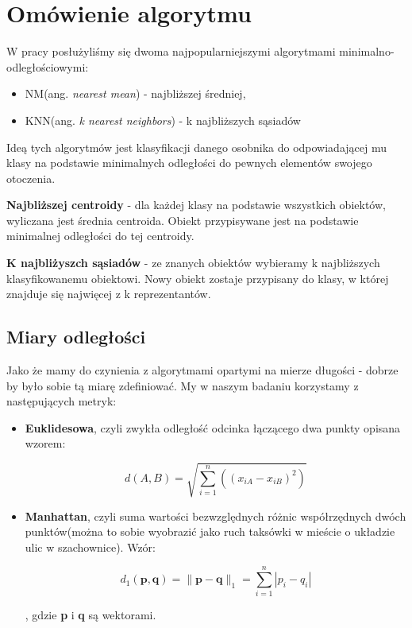 \section{Omówienie algorytmu}
	W pracy posłużyliśmy się dwoma najpopularniejszymi algorytmami minimalno-odległościowymi:
	
	\begin{itemize}
		\item NM(ang. \textit{nearest mean}) - najbliższej średniej,
		\item KNN(ang. \textit{k nearest neighbors}) - k najbliższych sąsiadów
	\end{itemize}

	\bigbreak
	Ideą tych algorytmów jest klasyfikacji danego osobnika do odpowiadającej mu klasy na podstawie minimalnych odległości do pewnych elementów swojego otoczenia.

	\bigbreak
	\textbf{Najbliższej centroidy} - dla każdej klasy na podstawie wszystkich obiektów, wyliczana jest średnia centroida. Obiekt przypisywane jest na podstawie minimalnej odległości do tej centroidy.
	
	\textbf{K najbliżyszch sąsiadów} - ze znanych obiektów wybieramy k najbliższych klasyfikowanemu obiektowi. Nowy obiekt zostaje przypisany do klasy, w której znajduje się najwięcej z k reprezentantów.
	
	\subsection{Miary odległości}
	
	Jako że mamy do czynienia z algorytmami opartymi na mierze długości - dobrze by było sobie tą miarę zdefiniować. My w naszym badaniu korzystamy z następujących metryk:
	
	\begin{itemize}
		\item \textbf{Euklidesowa}, czyli zwykła odległość odcinka łączącego dwa punkty opisana wzorem:
		
		\[d(A,B)=\sqrt{\sum\limits_{i=1}^n((x_{iA}-x_{iB})^2)}\]
		
		\item \textbf{Manhattan}, czyli suma wartości bezwzględnych różnic współrzędnych dwóch punktów(można to sobie wyobrazić jako ruch taksówki w mieście o układzie ulic w szachownice). Wzór:
		
		\[d_1(\mathbf{p}, \mathbf{q}) = \|\mathbf{p} - \mathbf{q}\|_1 = \sum_{i=1}^n |p_i-q_i|\]
		
		, gdzie \textbf{p} i \textbf{q} są wektorami.
	\end{itemize}